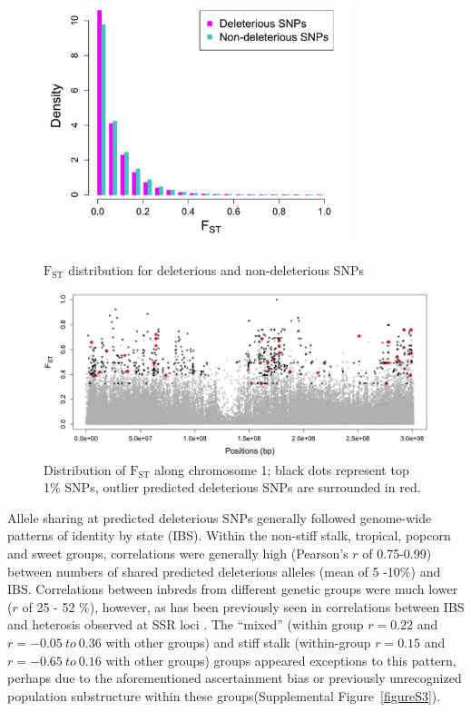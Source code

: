 \documentclass[12pt]{article}
\begin{document}
\begin{figure}[!t]
  \begin{center}
   \includegraphics[width=90mm]{Fst.png}
    \caption{$\mathrm{F}_{\mathrm{ST}}$ distribution for deleterious and non-deleterious SNPs}
   \label{fst_dist}
  \end{center}
  \begin{center}
   \includegraphics[width=150mm]{Fst2.png}
    \caption{Distribution of $\mathrm{F}_{\mathrm{ST}}$ along chromosome 1; black dots represent top 1\% SNPs, outlier predicted deleterious SNPs are surrounded in red.} 
   \label{fst_chr1}
  \end{center}
\end{figure}

Allele sharing at predicted deleterious SNPs generally followed genome-wide patterns of identity by state (IBS). Within the non-stiff stalk, tropical, popcorn and sweet groups, correlations were generally high (Pearson's $r$ of 0.75-0.99) between numbers of shared predicted deleterious alleles (mean of 5 -10\%) and IBS. Correlations between inbreds from different genetic groups were much lower ($r$ of 25 - 52 \%), however, as has been previously seen in correlations  between IBS and heterosis observed at SSR loci \citep{Flint-Garcia2009}. The  ``mixed'' (within group $r=0.22$ and $r=-0.05\ to\ 0.36$ with other groups) and stiff stalk (within-group $r=0.15$ and $r=-0.65\ to\ 0.16$ with other groups) groups appeared exceptions to this pattern, perhaps due to the aforementioned ascertainment bias or previously unrecognized population substructure within these groups(Supplemental Figure~\ref{figureS3}). 
\end{document}
